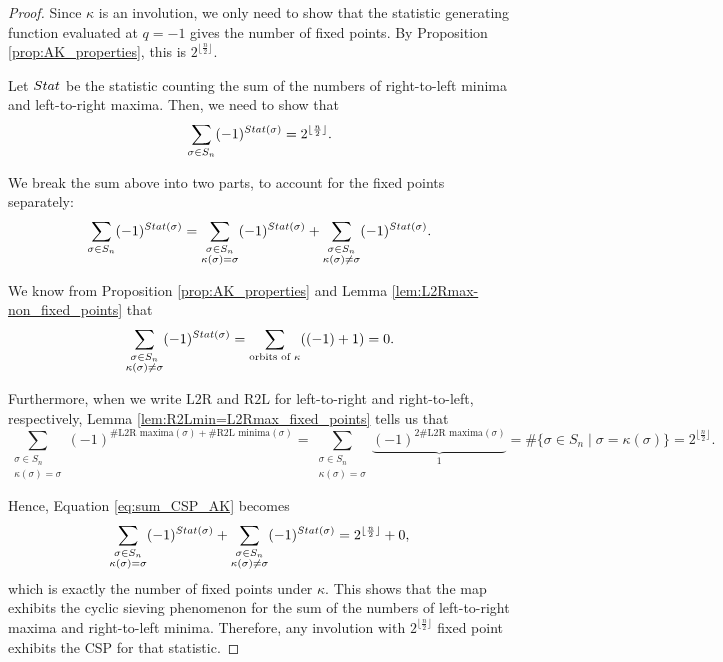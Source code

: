 \documentclass{amsart}
\theoremstyle{definition}
\newcommand{\Stat}{\textnormal{Stat}}
\begin{document}
\begin{proof}
  Since $\kappa$ is an involution, we only need to show that the statistic generating function evaluated at $q=-1$ gives the number of fixed points. By Proposition \ref{prop:AK_properties}, this is $2^{\lfloor \frac{n}{2}\rfloor}$.

  Let $\Stat$ be the statistic counting the sum of the numbers of right-to-left minima and left-to-right maxima. Then, we need to show that
  \[\sum_{\sigma \in S_n} (-1)^{\Stat(\sigma)} = 2^{\lfloor \frac{n}{2}\rfloor}.\]

  We break the sum above into two parts, to account for the fixed points separately:
  \begin{equation}
    \sum_{\sigma \in S_n} (-1)^{\Stat(\sigma)} = \sum_{\substack{\sigma \in S_n\\ \kappa(\sigma) = \sigma}} (-1)^{\Stat(\sigma)} + \sum_{\substack{\sigma \in S_n\\ \kappa(\sigma) \neq \sigma}} (-1)^{\Stat(\sigma)}.\label{eq:sum_CSP_AK}
  \end{equation}

  We know from Proposition \ref{prop:AK_properties} and Lemma \ref{lem:L2Rmax-non_fixed_points} that
  \[\sum_{\substack{\sigma \in S_n\\ \kappa(\sigma) \neq \sigma}} (-1)^{\Stat(\sigma)} =\sum_{\text{orbits of }\kappa} ((-1) + 1) = 0.\]

  Furthermore, when we write $\text{L2R}$ and $\text{R2L}$ for left-to-right and right-to-left, respectively, Lemma \ref{lem:R2Lmin=L2Rmax_fixed_points} tells us that
  \[\sum_{\substack{\sigma \in S_n\\ \kappa(\sigma) = \sigma}} (-1)^{\#\text{L2R maxima}(\sigma) + \#\text{R2L minima}(\sigma)}=\sum_{\substack{\sigma \in S_n\\ \kappa(\sigma) = \sigma}} \underbrace{(-1)^{2\#\text{L2R maxima}(\sigma)}}_{1} = \#\{\sigma \in S_n\mid \sigma = \kappa(\sigma)\} = 2^{\lfloor \frac{n}{2}\rfloor}.\]

  Hence, Equation \eqref{eq:sum_CSP_AK} becomes
  \[\sum_{\substack{\sigma \in S_n\\ \kappa(\sigma) = \sigma}} (-1)^{\Stat(\sigma)} + \sum_{\substack{\sigma \in S_n\\ \kappa(\sigma) \neq \sigma}} (-1)^{\Stat(\sigma)} =  2^{\lfloor\frac{n}{2}\rfloor} + 0,\]
  which is exactly the number of fixed points under $\kappa$. This shows that the map exhibits the cyclic sieving phenomenon for the sum of the numbers of left-to-right maxima and right-to-left minima. Therefore, any involution with $2^{\lfloor\frac{n}{2}\rfloor}$ fixed point exhibits the CSP for that statistic.
\end{proof}
\end{document}
